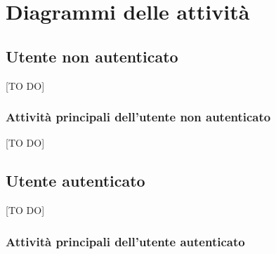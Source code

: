 %


\section{Diagrammi delle attività} %
\label{sec:diagrammi_delle_attivita}

	\subsection{Utente non autenticato} %
	\label{sub:utente_non_autenticato}
	[TO DO]
		\subsubsection{Attività principali dell'utente non autenticato} %
		\label{ssub:attivita_principali_dell_utente_non_autenticato}
		[TO DO]




	\pagebreak

	\subsection{Utente autenticato} %
	\label{sub:utente_autenticato}
	[TO DO]
		\subsubsection{Attività principali dell'utente autenticato} %
		\label{ssub:attivita_principali_dell_utente_autenticato}
		




